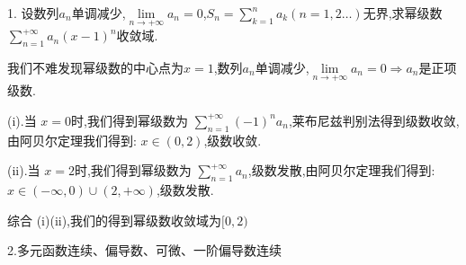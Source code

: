 1. 设数列${a_{n}}$单调减少,$\lim\limits_{n\rightarrow +\infty}a_{n}=0$,$S_{n}=\sum\limits_{k=1}^{n}a_{k}(n=1,2\dots)$无界,求幂级数 $\sum\limits_{n=1}^{+\infty}a_{n}(x-1)^{n}$收敛域.
\begin{solution}
	
	我们不难发现幂级数的中心点为$x=1$,数列${a_{n}}$单调减少,$\lim\limits_{n\rightarrow +\infty}a_{n}=0\Rightarrow a_{n}$是正项级数.
	
	(i).当 $x=0$时,我们得到幂级数为 $\sum\limits_{n=1}^{+\infty}(-1)^na_{n}$,莱布尼兹判别法得到级数收敛,由阿贝尔定理我们得到: $x\in(0,2)$,级数收敛.
	
	(ii).当 $x=2$时,我们得到幂级数为 $\sum\limits_{n=1}^{+\infty}a_{n}$,级数发散,由阿贝尔定理我们得到: $x\in (-\infty,0) \cup (2,+\infty)$,级数发散.
	
	综合 (i)(ii),我们的得到幂级数收敛域为$[0,2)$
\end{solution}

2.多元函数连续、偏导数、可微、一阶偏导数连续

